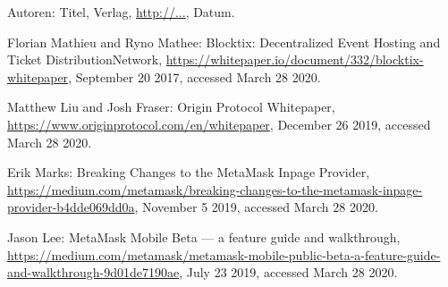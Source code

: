 \begin{thebibliography}{99}

 Autoren: Titel, Verlag, \url{http://...}, Datum.

 Florian Mathieu and Ryno Mathee: Blocktix: Decentralized Event Hosting and Ticket DistributionNetwork, \url{https://whitepaper.io/document/332/blocktix-whitepaper}, September 20 2017, accessed March 28 2020.


 Matthew Liu and Josh Fraser: Origin Protocol Whitepaper, \url{https://www.originprotocol.com/en/whitepaper}, December 26 2019, accessed March 28 2020.

 Erik Marks: Breaking Changes to the MetaMask Inpage Provider, \url{https://medium.com/metamask/breaking-changes-to-the-metamask-inpage-provider-b4dde069dd0a}, November 5 2019, accessed March 28 2020.

 Jason Lee: MetaMask Mobile Beta — a feature guide and walkthrough, \url{https://medium.com/metamask/metamask-mobile-public-beta-a-feature-guide-and-walkthrough-9d01de7190ae}, July 23 2019, accessed March 28 2020.



\end{thebibliography}

